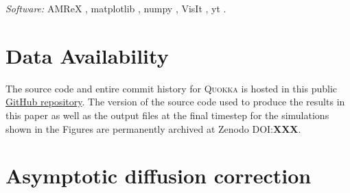 \documentclass[fleqn,usenatbib]{mnras}
\begin{document}
\emph{Software:} AMReX \citep{the_amrex_development_team_2021_5363443},
matplotlib \citep{Hunter:2007},
numpy \citep{harris2020array},
VisIt \citep{HPV:VisIt},
yt \citep{Turk11a}.

\section*{Data Availability}
The source code and entire commit history for \textsc{Quokka} is hosted in this public \faGithub\href{https://github.com/BenWibking/quokka-code}{GitHub repository}. The version of the source code used to produce the results in this paper as well as the output files at the final timestep for the simulations shown in the Figures are permanently archived at Zenodo DOI:\textbf{XXX}.






\appendix
\section{Asymptotic diffusion correction}
\label{appendix:asymptotic_correction}



\bsp	%
\label{lastpage}
\end{document}
